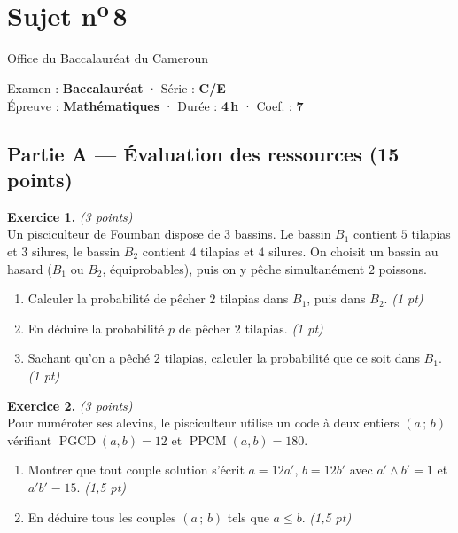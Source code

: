 \section{Sujet n\textsuperscript{o}\,8}
\noindent\begin{minipage}{0.5\linewidth}\footnotesize Office du Baccalauréat du Cameroun\end{minipage}%
\hfill\begin{minipage}{0.45\linewidth}\footnotesize\raggedleft Examen : \textbf{Baccalauréat} · Série : \textbf{C/E}\\
Épreuve : \textbf{Mathématiques} · Durée : \textbf{4\,h} · Coef. : \textbf{7}\end{minipage}
\par\smallskip{\color{onbo}\rule{\linewidth}{1pt}}

\subsection*{Partie A — Évaluation des ressources \hfill (15 points)}

\noindent\textbf{Exercice 1.} \hfill\textit{(3 points)}\\
Un pisciculteur de Foumban dispose de $3$ bassins. Le bassin $B_1$ contient $5$ tilapias
et $3$ silures, le bassin $B_2$ contient $4$ tilapias et $4$ silures. On choisit un bassin
au hasard ($B_1$ ou $B_2$, équiprobables), puis on y pêche simultanément $2$ poissons.
\begin{enumerate}[label=\arabic*)]
\item Calculer la probabilité de pêcher $2$ tilapias dans $B_1$, puis dans $B_2$. \hfill\textit{(1 pt)}
\item En déduire la probabilité $p$ de pêcher $2$ tilapias. \hfill\textit{(1 pt)}
\item Sachant qu'on a pêché $2$ tilapias, calculer la probabilité que ce soit dans $B_1$. \hfill\textit{(1 pt)}
\end{enumerate}

\smallskip
\noindent\textbf{Exercice 2.} \hfill\textit{(3 points)}\\
Pour numéroter ses alevins, le pisciculteur utilise un code à deux entiers $(a\,;\,b)$
vérifiant $\operatorname{PGCD}(a,b)=12$ et $\operatorname{PPCM}(a,b)=180$.
\begin{enumerate}[label=\arabic*)]
\item Montrer que tout couple solution s'écrit $a=12a'$, $b=12b'$ avec $a'\wedge b'=1$ et $a'b'=15$. \hfill\textit{(1,5 pt)}
\item En déduire tous les couples $(a\,;\,b)$ tels que $a\le b$. \hfill\textit{(1,5 pt)}
\end{enumerate}

